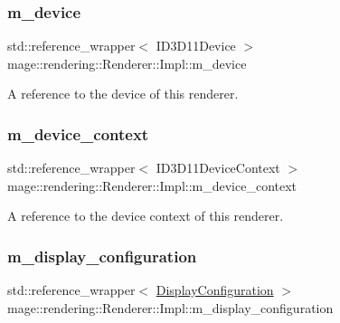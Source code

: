 \subsubsection{\texorpdfstring{m\+\_\+device}{m\_device}}
{\footnotesize\ttfamily std\+::reference\+\_\+wrapper$<$ I\+D3\+D11\+Device $>$ mage\+::rendering\+::\+Renderer\+::\+Impl\+::m\+\_\+device\hspace{0.3cm}{\ttfamily [private]}}

A reference to the device of this renderer. \hypertarget{classmage_1_1rendering_1_1_renderer_1_1_impl_a4ab027121f4d0fd9ab8f35f5d2fcfca6}{}\label{classmage_1_1rendering_1_1_renderer_1_1_impl_a4ab027121f4d0fd9ab8f35f5d2fcfca6} 
\subsubsection{\texorpdfstring{m\+\_\+device\+\_\+context}{m\_device\_context}}
{\footnotesize\ttfamily std\+::reference\+\_\+wrapper$<$ I\+D3\+D11\+Device\+Context $>$ mage\+::rendering\+::\+Renderer\+::\+Impl\+::m\+\_\+device\+\_\+context\hspace{0.3cm}{\ttfamily [private]}}

A reference to the device context of this renderer. \hypertarget{classmage_1_1rendering_1_1_renderer_1_1_impl_a10cf7a42791591339e7abae67e1a0624}{}\label{classmage_1_1rendering_1_1_renderer_1_1_impl_a10cf7a42791591339e7abae67e1a0624} 
\subsubsection{\texorpdfstring{m\+\_\+display\+\_\+configuration}{m\_display\_configuration}}
{\footnotesize\ttfamily std\+::reference\+\_\+wrapper$<$ \hyperlink{classmage_1_1rendering_1_1_display_configuration}{Display\+Configuration} $>$ mage\+::rendering\+::\+Renderer\+::\+Impl\+::m\+\_\+display\+\_\+configuration\hspace{0.3cm}{\ttfamily [private]}}

